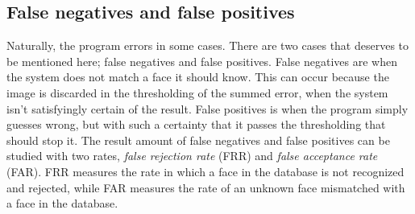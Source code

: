 \subsection{False negatives and false positives}
Naturally, the program errors in some cases. There are two cases that deserves
to be mentioned here; false negatives and false positives. False negatives are
when the system does not match a face it should know. This can occur because
the image is discarded in the thresholding of the summed error, when the
system isn’t satisfyingly certain of the result. False positives is when the
program simply guesses wrong, but with such a certainty that it passes the
thresholding that should stop it. The result amount of false negatives and
false positives can be studied with two rates, \emph{false rejection rate}
(FRR) and \emph{false acceptance rate} (FAR). FRR measures the rate in which a
face in the database is not recognized and rejected, while FAR measures the
rate of an unknown face mismatched with a face in the database.

